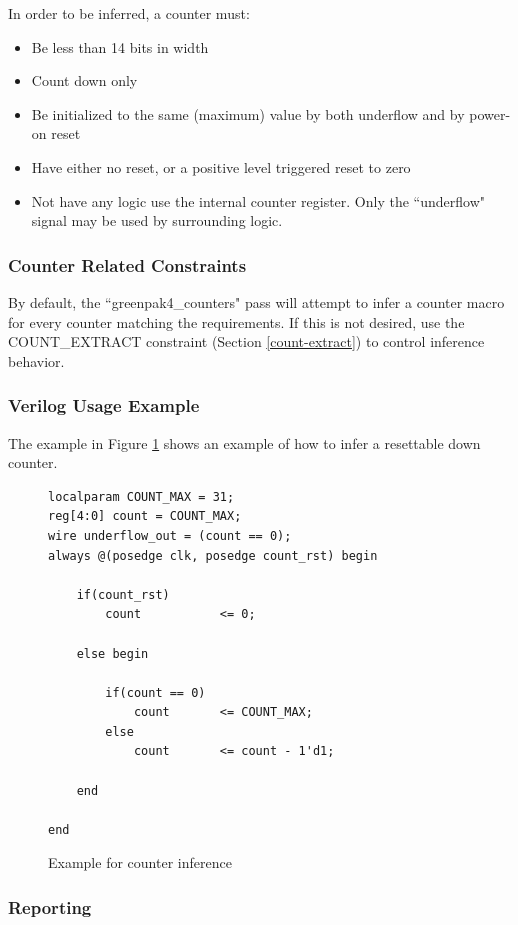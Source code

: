 \documentclass[11pt]{article}
\begin{document}
In order to be inferred, a counter must:

\begin{itemize}
\item Be less than 14 bits in width
\item Count down only
\item Be initialized to the same (maximum) value by both underflow and by power-on reset
\item Have either no reset, or a positive level triggered reset to zero
\item Not have any logic use the internal counter register. Only the ``underflow" signal may be used by surrounding logic.
\end{itemize}

\subsubsection{Counter Related Constraints}

By default, the ``greenpak4\_counters" pass will attempt to infer a counter macro for every counter matching the 
requirements. If this is not desired, use the COUNT\_EXTRACT constraint (Section \ref{count-extract}) to control 
inference behavior.

\clearpage
\subsubsection{Verilog Usage Example}

The example in Figure \ref{gp-countinfer-example} shows an example of how to infer a resettable down counter.

\begin{figure}[h]
\begin{lstlisting}
localparam COUNT_MAX = 31;
reg[4:0] count = COUNT_MAX;
wire underflow_out = (count == 0);
always @(posedge clk, posedge count_rst) begin
	
	if(count_rst)
		count			<= 0;
	
	else begin

		if(count == 0)
			count		<= COUNT_MAX;
		else
			count		<= count - 1'd1;

	end
	
end
\end{lstlisting}
\caption{Example for counter inference}
\label{gp-countinfer-example}
\end{figure}

\subsubsection{Reporting}
\end{document}
